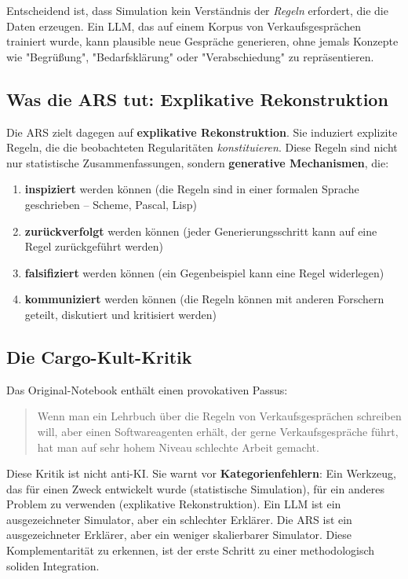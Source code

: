 \documentclass[12pt,a4paper]{article}
\begin{document}
Entscheidend ist, dass Simulation kein Verständnis der \textit{Regeln} erfordert, 
die die Daten erzeugen. Ein LLM, das auf einem Korpus von Verkaufsgesprächen 
trainiert wurde, kann plausible neue Gespräche generieren, ohne jemals Konzepte 
wie "Begrüßung", "Bedarfsklärung" oder "Verabschiedung" zu repräsentieren.

\subsection{Was die ARS tut: Explikative Rekonstruktion}

Die ARS zielt dagegen auf \textbf{explikative Rekonstruktion}. Sie induziert 
explizite Regeln, die die beobachteten Regularitäten \textit{konstituieren}. 
Diese Regeln sind nicht nur statistische Zusammenfassungen, sondern 
\textbf{generative Mechanismen}, die:

\begin{enumerate}
    \item \textbf{inspiziert} werden können (die Regeln sind in einer formalen 
    Sprache geschrieben – Scheme, Pascal, Lisp)
    \item \textbf{zurückverfolgt} werden können (jeder Generierungsschritt kann 
    auf eine Regel zurückgeführt werden)
    \item \textbf{falsifiziert} werden können (ein Gegenbeispiel kann eine 
    Regel widerlegen)
    \item \textbf{kommuniziert} werden können (die Regeln können mit anderen 
    Forschern geteilt, diskutiert und kritisiert werden)
\end{enumerate}

\subsection{Die Cargo-Kult-Kritik}

Das Original-Notebook enthält einen provokativen Passus:

\blockquote{Wenn man ein Lehrbuch über die Regeln von Verkaufsgesprächen 
schreiben will, aber einen Softwareagenten erhält, der gerne Verkaufsgespräche 
führt, hat man auf sehr hohem Niveau schlechte Arbeit gemacht.}

Diese Kritik ist nicht anti-KI. Sie warnt vor \textbf{Kategorienfehlern}: 
Ein Werkzeug, das für einen Zweck entwickelt wurde (statistische Simulation), 
für ein anderes Problem zu verwenden (explikative Rekonstruktion). Ein LLM ist 
ein ausgezeichneter Simulator, aber ein schlechter Erklärer. Die ARS ist ein 
ausgezeichneter Erklärer, aber ein weniger skalierbarer Simulator. Diese 
Komplementarität zu erkennen, ist der erste Schritt zu einer methodologisch 
soliden Integration.
\end{document}
